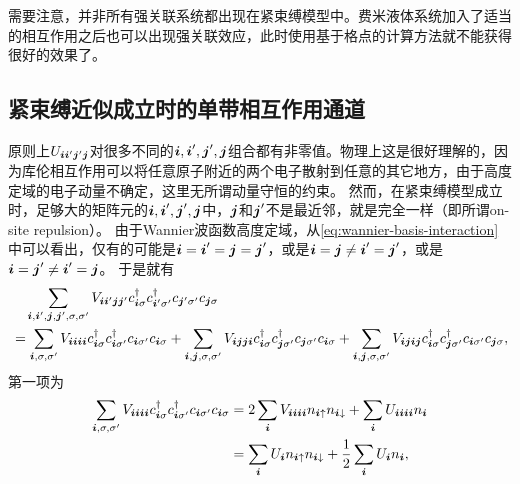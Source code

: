 需要注意，并非所有强关联系统都出现在紧束缚模型中。费米液体系统加入了适当的相互作用之后也可以出现强关联效应，此时使用基于格点的计算方法就不能获得很好的效果了。

\subsection{紧束缚近似成立时的单带相互作用通道}\label{sec:single-band-interaction-channel}

原则上$U_{\vb*{i} \vb*{i}' \vb*{j}' \vb*{j}}$对很多不同的$\vb*{i}, \vb*{i}', \vb*{j}', \vb*{j}$组合都有非零值。物理上这是很好理解的，因为库伦相互作用可以将任意原子附近的两个电子散射到任意的其它地方，由于高度定域的电子动量不确定，这里无所谓动量守恒的约束。
然而，在紧束缚模型成立时，足够大的矩阵元的$\vb*{i}, \vb*{i}', \vb*{j}', \vb*{j}$中，$\vb*{j}$和$\vb*{j}'$不是最近邻，就是完全一样（即所谓on-site repulsion）。
由于Wannier波函数高度定域，从\eqref{eq:wannier-basis-interaction}中可以看出，仅有的可能是$\vb*{i}=\vb*{i}'=\vb*{j}=\vb*{j}'$，或是$\vb*{i}=\vb*{j} \neq \vb*{i}'=\vb*{j}'$，或是$\vb*{i}=\vb*{j}' \neq \vb*{i}' = \vb*{j}$。
于是就有
\[
    \begin{aligned}
        &\quad \sum_{\vb*{i}, \vb*{i}', \vb*{j}, \vb*{j}', \sigma, \sigma'} V_{\vb*{i} \vb*{i}' \vb*{j} \vb*{j}'} c^\dagger_{\vb*{i} \sigma} c^\dagger_{\vb*{i}' \sigma'} c_{\vb*{j}' \sigma'} c_{\vb*{j} \sigma} \\
        &= \sum_{\vb*{i}, \sigma, \sigma'} V_{\vb*{i} \vb*{i} \vb*{i} \vb*{i}} c^\dagger_{\vb*{i} \sigma} c^\dagger_{\vb*{i} \sigma'} c_{\vb*{i} \sigma'} c_{\vb*{i} \sigma} 
        + \sum_{\vb*{i}, \vb*{j}, \sigma, \sigma'} V_{\vb*{i} \vb*{j} \vb*{j} \vb*{i}} c^\dagger_{\vb*{i} \sigma} c^\dagger_{\vb*{j} \sigma'} c_{\vb*{j} \sigma'} c_{\vb*{i} \sigma}
        + \sum_{\vb*{i}, \vb*{j}, \sigma, \sigma'} V_{\vb*{i} \vb*{j} \vb*{i} \vb*{j}} c^\dagger_{\vb*{i} \sigma} c^\dagger_{\vb*{j} \sigma'} c_{\vb*{i} \sigma'} c_{\vb*{j} \sigma},
    \end{aligned}
\]
第一项为
\[
    \begin{aligned}
        \sum_{\vb*{i}, \sigma, \sigma'} V_{\vb*{i} \vb*{i} \vb*{i} \vb*{i}} c^\dagger_{\vb*{i} \sigma} c^\dagger_{\vb*{i} \sigma'} c_{\vb*{i} \sigma'} c_{\vb*{i} \sigma} &= 2 \sum_{\vb*{i}} V_{\vb*{i} \vb*{i} \vb*{i} \vb*{i}} n_{\vb*{i} \uparrow} n_{\vb*{i} \downarrow} + \sum_{\vb*{i}} U_{\vb*{i} \vb*{i} \vb*{i} \vb*{i}} n_{\vb*{i}} \\
        &= \sum_{\vb*{i}} U_{\vb*{i}} n_{\vb*{i} \uparrow} n_{\vb*{i} \downarrow} + \frac{1}{2} \sum_{\vb*{i}} U_{\vb*{i}} n_{\vb*{i}},
    \end{aligned}
\]
